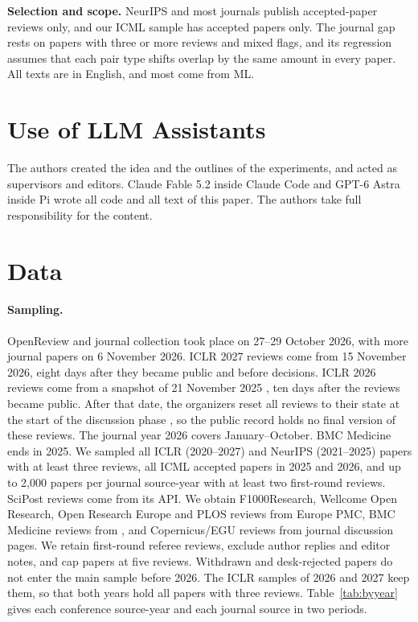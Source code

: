 \documentclass[11pt]{article}
\begin{document}
\textbf{Selection and scope.} NeurIPS and most journals publish accepted-paper reviews only, and our ICML sample has accepted papers only. The journal gap rests on \JournalGapVarying{} papers with three or more reviews and mixed flags, and its regression assumes that each pair type shifts overlap by the same amount in every paper. All texts are in English, and most come from ML.

\section*{Use of LLM Assistants}
The authors created the idea and the outlines of the experiments, and acted as supervisors and editors. Claude Fable 5.2 inside Claude Code and GPT-6 Astra inside Pi wrote all code and all text of this paper. The authors take full responsibility for the content.


\appendix
\onecolumn
\renewcommand{\dbltopfraction}{0.95}
\renewcommand{\dblfloatpagefraction}{0.7}
\renewcommand{\topfraction}{0.95}
\renewcommand{\textfraction}{0.05}
\setcounter{dbltopnumber}{4}
\setcounter{topnumber}{4}
\setcounter{bottomnumber}{3}
\setcounter{totalnumber}{6}
\renewcommand{\bottomfraction}{0.9}
\renewcommand{\floatpagefraction}{0.8}

\section{Data}
\label{app:data}

\paragraph{Sampling.}
OpenReview and journal collection took place on 27--29 October 2026, with more journal papers on 6 November 2026. ICLR 2027 reviews come from 15 November 2026, eight days after they became public and before decisions. ICLR 2026 reviews come from a snapshot of 21 November 2025 \citep{heineman2026iclr}, ten days after the reviews became public. After that date, the organizers reset all reviews to their state at the start of the discussion phase \citep{iclr2026incident}, so the public record holds no final version of these reviews. The journal year 2026 covers January--October. BMC Medicine ends in 2025. We sampled all ICLR (2020--2027) and NeurIPS (2021--2025) papers with at least three reviews, all ICML accepted papers in 2025 and 2026, and up to 2,000 papers per journal source-year with at least two first-round reviews. SciPost reviews come from its API. We obtain F1000Research, Wellcome Open Research, Open Research Europe and PLOS reviews from Europe PMC, BMC Medicine reviews from \citet{jerma2026bmc}, and Copernicus/EGU reviews from journal discussion pages. We retain first-round referee reviews, exclude author replies and editor notes, and cap papers at five reviews. Withdrawn and desk-rejected papers do not enter the main sample before 2026. The ICLR samples of 2026 and 2027 keep them, so that both years hold all papers with three reviews. Table~\ref{tab:byyear} gives each conference source-year and each journal source in two periods.
\end{document}
